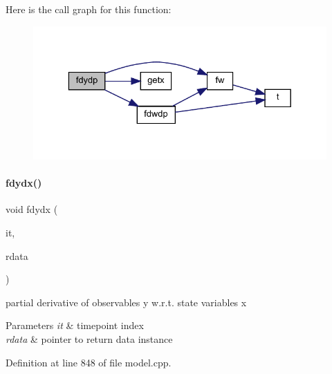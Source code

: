 Here is the call graph for this function\+:
\nopagebreak
\begin{figure}[H]
\begin{center}
\leavevmode
\includegraphics[width=329pt]{classamici_1_1_model_a884ccb083130cb1af7ebe93f7a6d361a_cgraph}
\end{center}
\end{figure}
\mbox{\label{classamici_1_1_model_a3ec46e89aed7bd191fb21ac3e501edd2}} 
\paragraph{\texorpdfstring{fdydx()}{fdydx()}\hspace{0.1cm}{\footnotesize\ttfamily [1/2]}}
{\footnotesize\ttfamily void fdydx (\begin{DoxyParamCaption}\item[{const int}]{it,  }\item[{\mbox{\hyperlink{classamici_1_1_return_data}{Return\+Data}} $\ast$}]{rdata }\end{DoxyParamCaption})}

partial derivative of observables y w.\+r.\+t. state variables x 
\begin{DoxyParams}{Parameters}
{\em it} & timepoint index \\
\hline
{\em rdata} & pointer to return data instance \\
\hline
\end{DoxyParams}


Definition at line 848 of file model.\+cpp.

